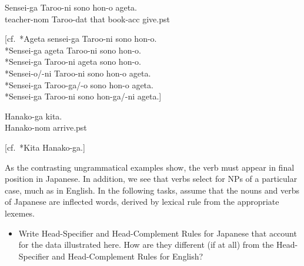 \documentclass[a4paper,landscape,headrule,footrule]{foils}
\begin{document}
\begin{exe}
\ex
\gll   Sensei-ga  Taroo-ni  sono   hon-o  ageta. \\
 teacher-{\sc nom} Taroo-{\sc dat} that   book-{\sc acc} give.{\sc pst} \\

[cf.\ *Ageta sensei-ga Taroo-ni sono hon-o. \\ {*}Sensei-ga ageta Taroo-ni
sono hon-o. \\ {*}Sensei-ga Taroo-ni ageta sono hon-o. \\ {*}Sensei-o/-ni
Taroo-ni sono hon-o ageta. \\ {*}Sensei-ga Taroo-ga/-o sono hon-o ageta.\\
{*}Sensei-ga Taroo-ni sono hon-ga/-ni ageta.]

\ex\label{jp:last}
\gll Hanako-ga   kita. \\
 Hanako-{\sc nom}   arrive.{\sc pst} \\

[cf.\ *Kita Hanako-ga.]
\end{exe}

As the contrasting ungrammatical examples show, the verb must appear
in final position in Japanese. In addition, we see that verbs select
for NPs of a particular case, much as in English. In the following
tasks, assume that the nouns and verbs of Japanese are inflected
words, derived by lexical rule from the appropriate lexemes.

\begin{itemize}\addtolength{\itemsep}{1ex}
\item[A.] Write Head-Specifier and Head-Complement Rules for
Japanese that account for the data illustrated here.  How are
they different (if at all) from the Head-Specifier and Head-Complement 
Rules for English?
\end{itemize}
\end{document}
